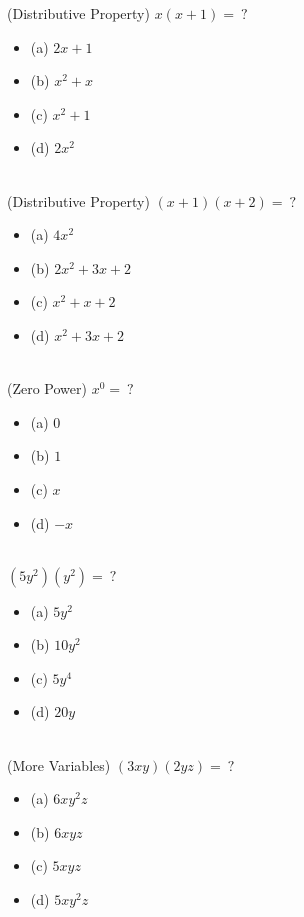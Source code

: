 \documentclass{article}
\begin{document}
(Distributive Property) $x (x + 1) = \ ?$
\begin{itemize}
\item[] (a) $2x + 1$
\item[] (b) $x^2 + x$
\item[] (c) $x^2  +1$
\item[] (d) $2x^2 $
\end{itemize} \hrulefill \\[10pt]
(Distributive Property) $(x+1) (x+2) = \ ?$
\begin{itemize}
\item[](a) $4x^2$
\item[](b) $2x^2 + 3x + 2$
\item[](c) $x^2 + x + 2$
\item[](d) $x^2 + 3x + 2$
\end{itemize} \hrulefill \\[10pt]
\newpage
\noindent (Zero Power) $x^0 = \ ?$
\begin{itemize}
\item[](a) $0$
\item[](b) $1$
\item[](c) $x$
\item[](d) $-x$
\end{itemize} \hrulefill \\[10pt]
$(5y^2)(y^2) = \ ?$
\begin{itemize}
\item[](a) $5y^2$
\item[](b) $10y^2$
\item[](c) $5y^4$
\item[](d) $20y$
\end{itemize} \hrulefill \\[10pt]
(More Variables) $(3xy)(2yz) = \ ?$
\begin{itemize}
\item[](a) $6xy^2z$
\item[](b) $6xyz$
\item[](c) $5xyz$
\item[](d) $5xy^2z$
\end{itemize} \hrulefill \\[10pt]
\end{document}
